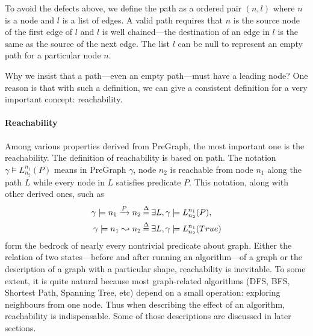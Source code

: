 To avoid the defects above, we define the path as a ordered pair $(n,
l)$ where $n$ is a node and $l$ is a list of edges. A valid path
requires that $n$ is the source node of the first edge of $l$ and $l$
is well chained---the destination of an edge in $l$ is the same as the
source of the next edge. The list $l$ can be null to represent an
empty path for a particular node $n$.

Why we insist that a path---even an empty path---must have a leading
node? One reason is that with such a definition, we can give a
consistent definition for a very important concept: reachability.

\paragraph{Reachability}
Among various properties derived from PreGraph, the most important one
is the reachability. The definition of reachability is based on
path. The notation $\gamma \models L_{n_2}^{n_1}(P)$ means in PreGraph
$\gamma$, node $n_2$ is reachable from node $n_1$ along the path $L$
while every node in $L$ satisfies predicate $P$. This notation, along
with other derived ones, such as
\begin{equation*}
\begin{split}
\gamma\models n_1 \xrightarrow{P} n_2 &\mathbin{\stackrel{\Delta}{=}} \exists L, \gamma \models L_{n_2}^{n_1}(P),\\
\gamma\models n_1 \leadsto n_2 &\mathbin{\stackrel{\Delta}{=}} \exists L, \gamma \models L_{n_2}^{n_1}(True)
\end{split}
\end{equation*}
form the bedrock of nearly every nontrivial predicate about
graph. Either the relation of two states---before and after running an
algorithm---of a graph or the description of a graph with a particular
shape, reachability is inevitable. To some extent, it is quite natural
because most graph-related algorithms (DFS, BFS, Shortest Path,
Spanning Tree, etc) depend on a small operation: exploring neighbours
from one node. Thus when describing the effect of an algorithm,
reachability is indispensable. Some of those descriptions are
discussed in later sections.

